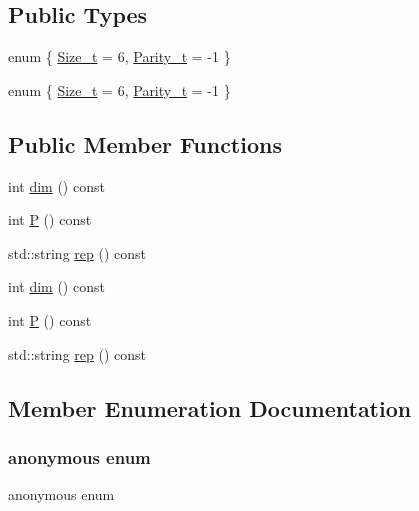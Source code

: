 \subsection*{Public Types}
\begin{DoxyCompactItemize}
\item 
enum \{ \mbox{\hyperlink{structHadron_1_1J5o2uRep_aef08049112e64edc8dcf662004fa0259a759f579b8294f7b0dda14d5130df425d}{Size\+\_\+t}} = 6, 
\mbox{\hyperlink{structHadron_1_1J5o2uRep_aef08049112e64edc8dcf662004fa0259a1da8e95dfec53adf8b99c3532fa651bc}{Parity\+\_\+t}} = -\/1
 \}
\item 
enum \{ \mbox{\hyperlink{structHadron_1_1J5o2uRep_aef08049112e64edc8dcf662004fa0259a759f579b8294f7b0dda14d5130df425d}{Size\+\_\+t}} = 6, 
\mbox{\hyperlink{structHadron_1_1J5o2uRep_aef08049112e64edc8dcf662004fa0259a1da8e95dfec53adf8b99c3532fa651bc}{Parity\+\_\+t}} = -\/1
 \}
\end{DoxyCompactItemize}
\subsection*{Public Member Functions}
\begin{DoxyCompactItemize}
\item 
int \mbox{\hyperlink{structHadron_1_1J5o2uRep_a7168156bdf8a4353ed627e4be0a16f8b}{dim}} () const
\item 
int \mbox{\hyperlink{structHadron_1_1J5o2uRep_a61de16e8a0a311ebef917a04c3930c4f}{P}} () const
\item 
std\+::string \mbox{\hyperlink{structHadron_1_1J5o2uRep_a553987fff53057668bc9213e32116341}{rep}} () const
\item 
int \mbox{\hyperlink{structHadron_1_1J5o2uRep_a7168156bdf8a4353ed627e4be0a16f8b}{dim}} () const
\item 
int \mbox{\hyperlink{structHadron_1_1J5o2uRep_a61de16e8a0a311ebef917a04c3930c4f}{P}} () const
\item 
std\+::string \mbox{\hyperlink{structHadron_1_1J5o2uRep_a553987fff53057668bc9213e32116341}{rep}} () const
\end{DoxyCompactItemize}


\subsection{Member Enumeration Documentation}
\mbox{\label{structHadron_1_1J5o2uRep_aabd989a0b784c7866564227122cd72fa}} 
\subsubsection{\texorpdfstring{anonymous enum}{anonymous enum}}
{\footnotesize\ttfamily anonymous enum}

